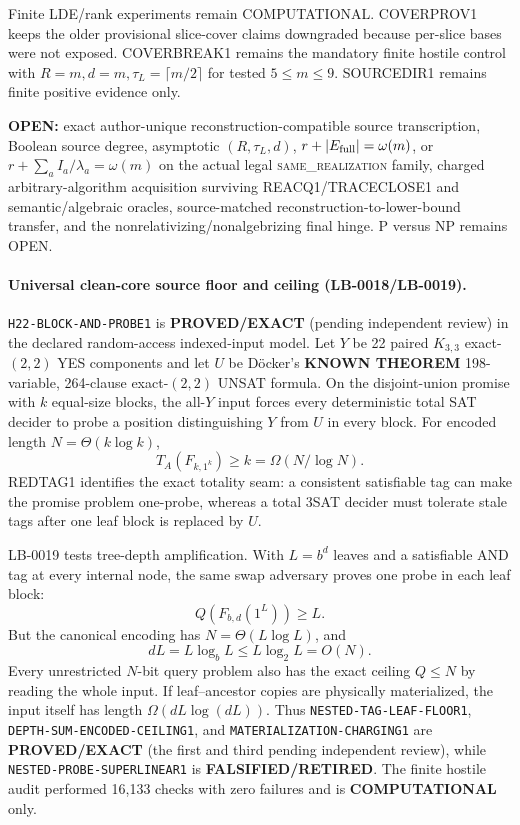 \documentclass[11pt]{article}
\begin{document}
Finite LDE/rank experiments remain COMPUTATIONAL. COVERPROV1 keeps the older provisional
slice-cover claims downgraded because per-slice bases were not exposed. COVERBREAK1 remains the
mandatory finite hostile control with \(R=m,d=m,\tau_L=\lceil m/2\rceil\) for tested \(5\le m\le9\).
SOURCEDIR1 remains finite positive evidence only.

\textbf{OPEN:} exact author-unique reconstruction-compatible source transcription, Boolean source
degree, asymptotic \((R,\tau_L,d)\), \(r+|E_{\rm full}|=\omega(m)\), or \(r+\sum_a I_a/\lambda_a=\omega(m)\) on the actual legal
\textsc{same\_realization} family, charged arbitrary-algorithm acquisition surviving
REACQ1/TRACECLOSE1 and semantic/algebraic oracles, source-matched reconstruction-to-lower-bound
transfer, and the nonrelativizing/nonalgebrizing final hinge. P versus NP remains OPEN.

\paragraph{Universal clean-core source floor and ceiling (LB-0018/LB-0019).}
\texttt{H22-BLOCK-AND-PROBE1} is \textbf{PROVED/EXACT} (pending independent
review) in the declared random-access indexed-input model.  Let \(Y\) be 22
paired \(K_{3,3}\) exact-\((2,2)\) YES components and let \(U\) be
D\"ocker's \textbf{KNOWN THEOREM} 198-variable, 264-clause exact-\((2,2)\)
UNSAT formula.  On the disjoint-union promise with \(k\) equal-size blocks,
the all-\(Y\) input forces every deterministic total SAT decider to probe a
position distinguishing \(Y\) from \(U\) in every block.  For encoded length
\(N=\Theta(k\log k)\),
\[
 T_A(F_{k,1^k})\ge k=\Omega(N/\log N).
\]
REDTAG1 identifies the exact totality seam: a consistent satisfiable tag can
make the promise problem one-probe, whereas a total 3SAT decider must tolerate
stale tags after one leaf block is replaced by \(U\).

LB-0019 tests tree-depth amplification.  With \(L=b^d\) leaves and a
satisfiable AND tag at every internal node, the same swap adversary proves one
probe in each leaf block:
\[
  Q(F_{b,d}(1^L))\ge L .
\]
But the canonical encoding has \(N=\Theta(L\log L)\), and
\[
 dL=L\log_bL\le L\log_2L=O(N).
\]
Every unrestricted \(N\)-bit query problem also has the exact ceiling
\(Q\le N\) by reading the whole input.  If leaf--ancestor copies are physically
materialized, the input itself has length
\(\Omega(dL\log(dL))\).  Thus
\texttt{NESTED-TAG-LEAF-FLOOR1},
\texttt{DEPTH-SUM-ENCODED-CEILING1}, and
\texttt{MATERIALIZATION-CHARGING1} are \textbf{PROVED/EXACT} (the first and
third pending independent review), while
\texttt{NESTED-PROBE-SUPERLINEAR1} is
\textbf{FALSIFIED/RETIRED}.  The finite hostile audit performed 16,133 checks
with zero failures and is \textbf{COMPUTATIONAL} only.
\end{document}
